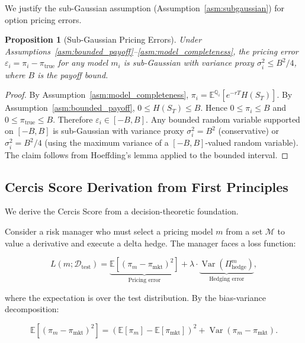 \documentclass[11pt,a4paper]{article}
\theoremstyle{plain}
\newtheorem{proposition}[theorem]{Proposition}
\theoremstyle{definition}
\theoremstyle{remark}
\newcommand{\E}{\mathbb{E}}
\newcommand{\Var}{\operatorname{Var}}
\newcommand{\M}{\mathcal{M}}
\newcommand{\riskneutral}{\mathbb{Q}}
\begin{document}
We justify the sub-Gaussian assumption (Assumption~\ref{asm:subgaussian}) for option pricing errors.

\begin{proposition}[Sub-Gaussian Pricing Errors]\label{prop:subgaussian_justification}
Under Assumptions~\ref{asm:bounded_payoff}--\ref{asm:model_completeness}, the pricing error $\varepsilon_i = \pi_i - \pi_{\text{true}}$ for any model $m_i$ is sub-Gaussian with variance proxy $\sigma_i^2 \leq B^2 / 4$, where $B$ is the payoff bound.
\end{proposition}

\begin{proof}
By Assumption~\ref{asm:model_completeness}, $\pi_i = \E^{\riskneutral_i}[e^{-rT} H(S_T)]$. By Assumption~\ref{asm:bounded_payoff}, $0 \leq H(S_T) \leq B$. Hence $0 \leq \pi_i \leq B$ and $0 \leq \pi_{\text{true}} \leq B$. Therefore $\varepsilon_i \in [-B, B]$. Any bounded random variable supported on $[-B, B]$ is sub-Gaussian with variance proxy $\sigma_i^2 = B^2$ (conservative) or $\sigma_i^2 = B^2/4$ (using the maximum variance of a $[-B,B]$-valued random variable). The claim follows from Hoeffding's lemma applied to the bounded interval.
\end{proof}

\subsection{Cercis Score Derivation from First Principles}

We derive the Cercis Score from a decision-theoretic foundation.

Consider a risk manager who must select a pricing model $m$ from a set $\M$ to value a derivative and execute a delta hedge. The manager faces a loss function:

\begin{equation}\label{eq:loss}
  L(m; \mathcal{D}_{\text{test}}) = \underbrace{\E\left[(\pi_m - \pi_{\text{mkt}})^2\right]}_{\text{Pricing error}} + \lambda \cdot \underbrace{\Var(\Pi_{\text{hedge}}^m)}_{\text{Hedging error}},
\end{equation}

where the expectation is over the test distribution. By the bias-variance decomposition:

\begin{equation}\label{eq:bias_variance}
  \E[(\pi_m - \pi_{\text{mkt}})^2] = (\E[\pi_m] - \E[\pi_{\text{mkt}}])^2 + \Var(\pi_m - \pi_{\text{mkt}}).
\end{equation}
\end{document}

